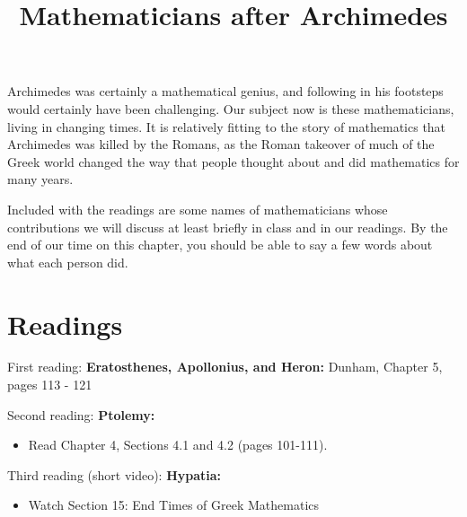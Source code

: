 \documentclass[nooutcomes]{ximera}
\title{Mathematicians after Archimedes}
\begin{document}
\begin{abstract}
    
\end{abstract}
\maketitle

Archimedes was certainly a mathematical genius, and following in his footsteps would certainly have been challenging.  Our subject now is these mathematicians, living in changing times.  It is relatively fitting to the story of mathematics that Archimedes was killed by the Romans, as the Roman takeover of much of the Greek world changed the way that people thought about and did mathematics for many years.

Included with the readings are some names of mathematicians whose contributions we will discuss at least briefly in class and in our readings.  By the end of our time on this chapter, you should be able to say a few words about what each person did.




\section{Readings}
First reading: {\bf Eratosthenes, Apollonius, and Heron:} Dunham, Chapter 5, pages 113 - 121 


Second reading: {\bf Ptolemy:} 
\begin{itemize}
	\item Read Chapter 4, Sections 4.1 and 4.2 (pages 101-111).
\end{itemize}

Third reading (short video): {\bf Hypatia:}  

\begin{itemize}
\item Watch Section 15: End Times of Greek Mathematics
\end{itemize}
\end{document}
